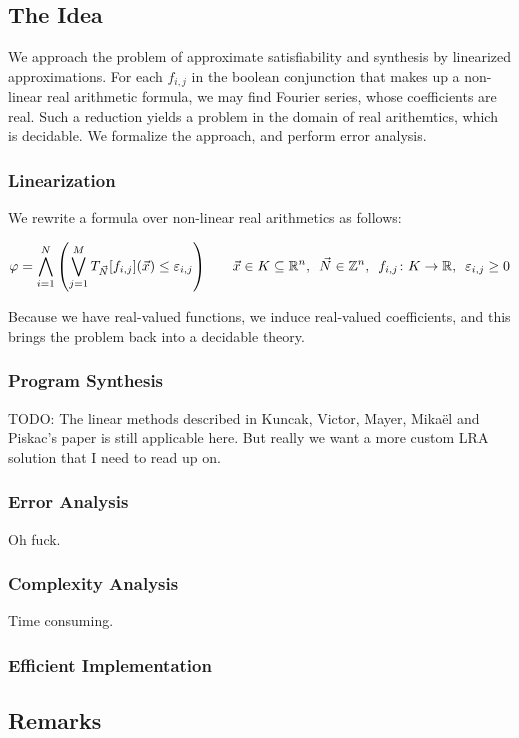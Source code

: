\documentclass[12pt]{article}
\begin{document}
\subsection{The Idea}
We approach the problem of approximate satisfiability and synthesis
by linearized approximations.
For each $f_{i, j}$ in the boolean conjunction that makes up a
non-linear real arithmetic formula,
we may find Fourier series, whose coefficients are real.
Such a reduction yields a problem in the domain of real arithemtics, which
is decidable.
We formalize the approach, and perform error analysis.

\subsubsection{Linearization}
We rewrite a formula over non-linear real arithmetics as follows:

\begin{align*}
  \varphi
    = \bigwedge_{i = 1}^{N} {\left(\bigvee_{j = 1}^{M}
   T_{\vec{N}} {\left[f_{i,j}\right]}{\left(\vec{x}\right)} \leq \varepsilon_{i,j}\right)}
  \qquad
  \vec{x} \in K \subseteq {\mathbb{R}}^n, \enskip
  \vec{N} \in {\mathbb{Z}}^n, \enskip
  {f_{i, j} \colon K \to {\mathbb{R}}}, \enskip
  \varepsilon_{i, j} \geq 0
\end{align*}

Because we have real-valued functions, we induce real-valued coefficients,
and this brings the problem back into a decidable theory.


\subsubsection{Program Synthesis}
TODO: The linear methods described in Kuncak, Victor, Mayer, Mika\"{e}l
and Piskac's paper is still applicable here.
But really we want a more custom LRA solution that I need to read up on.


\subsubsection{Error Analysis}
Oh fuck.

\subsubsection{Complexity Analysis}
Time consuming.

\subsubsection{Efficient Implementation}


\subsection{Remarks}



\printbibliography
\end{document}
